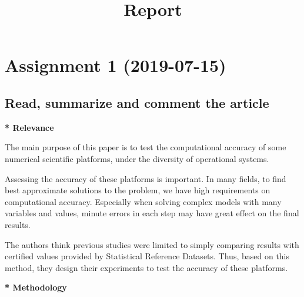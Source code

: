 \documentclass[conference,onecolumn]{IEEEtran}
\begin{document}
\title{Report}
\author{
}

\maketitle



\section{Assignment 1 (2019-07-15)}
\subsection{Read, summarize and comment the article}

\textbf{* Relevance}
	
The main purpose of this paper is to test the computational accuracy of some numerical scientific platforms, under the diversity of operational systems.

Assessing the accuracy of these platforms is important. In many fields, to find best approximate solutions to the problem, we have high requirements on computational accuracy. Especially when solving complex models with many variables and values, minute errors in each step may have great effect on the final results. 

The authors think previous studies were limited to simply comparing results with certified values provided by Statistical Reference Datasets. Thus, based on this method, they design their experiments to test the accuracy of these platforms.
	
\textbf{* Methodology}
	
\end{document}
